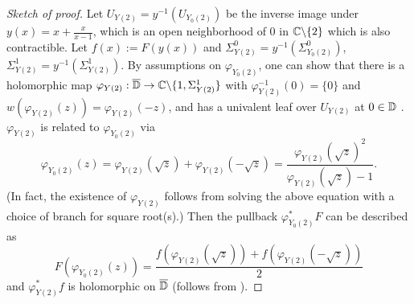 \begin{proof}[Sketch of proof]
Let $U_{Y(2)} = y^{-1}(U_{Y_0(2)})$ be the inverse image under $y(x) = x + \frac{x}{x-1}$, which is an open neighborhood of $0$ in $\mathbb{C} \backslash \{2\}$ which is also contractible.
Let $f(x) := F(y(x))$ and $\Sigma_{Y(2)}^{0} = y^{-1}(\Sigma_{Y_0(2)}^{0})$, $\Sigma_{Y(2)}^{1} = y^{-1}(\Sigma_{Y(2)}^{1})$.
By assumptions on $\varphi_{Y_0(2)}$, one can show that there is a holomorphic map $\varphi_{Y(2)}: \overline{\mathbb{D}} \to \mathbb{C} \backslash \{1, \Sigma_{Y(2)}^{1}\}$ with $\varphi_{Y(2)}^{-1}(0) = \{0\}$ and $w(\varphi_{Y(2)}(z)) = \varphi_{Y(2)}(-z)$, and has a univalent leaf over $U_{Y(2)}$ at $0 \in \mathbb{D}$ \cite[Lemma 9.0.13]{calegari2024linear}.
$\varphi_{Y(2)}$ is related to $\varphi_{Y_0(2)}$ via
$$
    \varphi_{Y_0(2)} (z) = \varphi_{Y(2)}(\sqrt{z}) + \varphi_{Y(2)}(-\sqrt{z}) = \frac{\varphi_{Y(2)}(\sqrt{z})^2}{\varphi_{Y(2)}(\sqrt{z}) - 1}.
$$
(In fact, the existence of $\varphi_{Y(2)}$ follows from solving the above equation with a choice of branch for square root(s).)
Then the pullback $\varphi_{Y_0(2)}^\ast F$ can be described as
$$
    F(\varphi_{Y_0(2)}(z)) = \frac{f (\varphi_{Y(2)}(\sqrt{z})) + f (\varphi_{Y(2)}(-\sqrt{z}))}{2}
$$
and $\varphi_{Y(2)}^\ast f$ is holomorphic on $\overline{\mathbb{D}}$ (follows from \cite[Proposition 2.9.3]{calegari2024linear}).
\end{proof}
